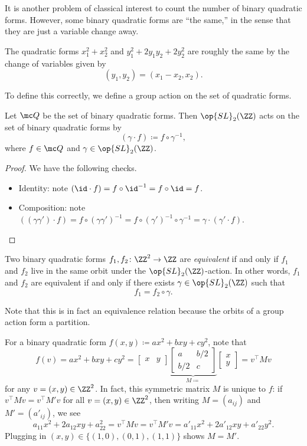 \documentclass[../notes.tex]{subfiles}
\begin{document}
It is another problem of classical interest to count the number of binary quadratic forms. However, some binary quadratic forms are ``the same,'' in the sense that they are just a variable change away.
\begin{example}
	The quadratic forms $x_1^2+x_2^2$ and $y_1^2+2y_1y_2+2y_2^2$ are roughly the same by the change of variables given by
	\[(y_1,y_2)=(x_1-x_2,x_2).\]
\end{example}
To define this correctly, we define a group action on the set of quadratic forms.
\begin{lemma}
	Let $\mc Q$ be the set of binary quadratic forms. Then $\op{SL}_2(\ZZ)$ acts on the set of binary quadratic forms by
	\[(\gamma\cdot f)\coloneqq f\circ\gamma^{-1},\]
	where $f\in\mc Q$ and $\gamma\in\op{SL}_2(\ZZ)$.
\end{lemma}
\begin{proof}
	We have the following checks.
	\begin{itemize}
		\item Identity: note $({\id}\cdot f)=f\circ{\id}^{-1}=f\circ{\id}=f$.
		\item Composition: note $((\gamma\gamma')\cdot f)=f\circ(\gamma\gamma')^{-1}=f\circ(\gamma')^{-1}\circ\gamma^{-1}=\gamma\cdot(\gamma'\cdot f)$.
		\qedhere
	\end{itemize}
\end{proof}
\begin{definition}[equivalent]
	Two binary quadratic forms $f_1,f_2\colon\ZZ^2\to\ZZ$ are \textit{equivalent} if and only if $f_1$ and $f_2$ live in the same orbit under the $\op{SL}_2(\ZZ)$-action. In other words, $f_1$ and $f_2$ are equivalent if and only if there exists $\gamma\in\op{SL}_2(\ZZ)$ such that
	\[f_1=f_2\circ\gamma.\]
\end{definition}
Note that this is in fact an equivalence relation because the orbits of a group action form a partition.
\begin{remark} \label{rem:get-matrix-from-form}
	For a binary quadratic form $f(x,y)\coloneqq ax^2+bxy+cy^2$, note that
	\[f(v)=ax^2+bxy+cy^2=\begin{bmatrix}
		x & y
	\end{bmatrix}\underbrace{\begin{bmatrix}
		a & b/2 \\
		b/2 & c
	\end{bmatrix}}_{M\coloneqq}\begin{bmatrix}
		x \\ y
	\end{bmatrix}=v^\intercal Mv\]
	for any $v=(x,y)\in\ZZ^2$. In fact, this symmetric matrix $M$ is unique to $f$: if $v^\intercal Mv=v^\intercal M'v$ for all $v=(x,y)\in\ZZ^2$, then writing $M=(a_{ij})$ and $M'=(a'_{ij})$, we see
	\[a_{11}x^2+2a_{12}xy+a_{22}^2=v^\intercal Mv=v^\intercal M'v=a'_{11}x^2+2a'_{12}xy+a'_{22}y^2.\]
	Plugging in $(x,y)\in\{(1,0),(0,1),(1,1)\}$ shows $M=M'$.
\end{remark}
\end{document}
